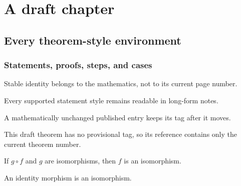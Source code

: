 \documentclass[sectionlevel=book,status=draft]{noteformyself}
\begin{document}
\chapter[
  status=draft,
  tag=0CD,
  label=\labelNFM{chap:mixed-draft}
]{A draft chapter}

\section[
  status=draft,
  tag=0CDEF,
  label=\labelNFM{sec:mixed-draft}
]{Every theorem-style environment}

\subsection[
  status=draft,
  tag=0CDEFS1,
  label=\labelNFM{subsec:mixed-draft}
]{Statements, proofs, steps, and cases}

\begin{slogan}
  Stable identity belongs to the mathematics, not to its current page number.
\end{slogan}

\begin{mainthm}[
  title={The gallery theorem},
  label=\labelNFM{mainthm:book}
]
  Every supported statement style remains readable in long-form notes.
\end{mainthm}

\begin{proposition}[
  title={A moved statement},
  status=published,
  tag=0ABEF01,
  label=\labelNFM{prop:published-in-draft}
]
  A mathematically unchanged published entry keeps its tag after it moves.
\end{proposition}

\begin{theorem}[label=\labelNFM{thm:untagged-draft}]
  This draft theorem has no provisional tag, so its reference contains only
  the current theorem number.
\end{theorem}

\begin{lemma}[
  title={Local cancellation},
  label=\labelNFM{lem:book}
]
  If \(g\circ f\) and \(g\) are isomorphisms, then \(f\) is an isomorphism.
\end{lemma}

\begin{corollary}[label=\labelNFM{cor:book}]
  An identity morphism is an isomorphism.
\end{corollary}
\end{document}

